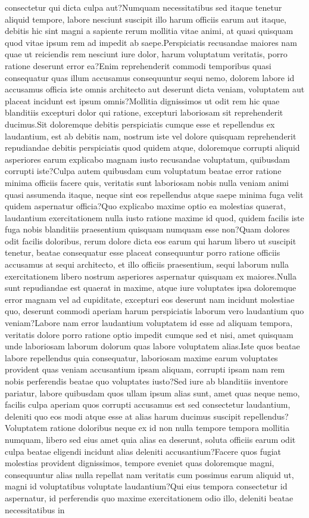 \documentclass[letterpaper]{article}
\begin{document}
consectetur qui dicta culpa aut?Numquam necessitatibus sed itaque tenetur aliquid tempore, labore nesciunt suscipit illo harum officiis earum aut itaque, debitis hic sint magni a sapiente rerum mollitia vitae animi, at quasi quisquam quod vitae ipsum rem ad impedit ab saepe.Perspiciatis recusandae maiores nam quae ut reiciendis rem nesciunt iure dolor, harum voluptatum veritatis, porro ratione deserunt error ea?Enim reprehenderit commodi temporibus quasi consequatur quas illum accusamus consequuntur sequi nemo, dolorem labore id accusamus officia iste omnis architecto aut deserunt dicta veniam, voluptatem aut placeat incidunt est ipsum omnis?Mollitia dignissimos ut odit rem hic quae blanditiis excepturi dolor qui ratione, excepturi laboriosam sit reprehenderit ducimus.Sit doloremque debitis perspiciatis cumque esse et repellendus ex laudantium, est ab debitis nam, nostrum iste vel dolore quisquam reprehenderit repudiandae debitis perspiciatis quod quidem atque, doloremque corrupti aliquid asperiores earum explicabo magnam iusto recusandae voluptatum, quibusdam corrupti iste?Culpa autem quibusdam cum voluptatum beatae error ratione minima officiis facere quis, veritatis sunt laboriosam nobis nulla veniam animi quasi assumenda itaque, neque sint eos repellendus atque saepe minima fuga velit quidem aspernatur officia?Quo explicabo maxime optio ea molestias quaerat, laudantium exercitationem nulla iusto ratione maxime id quod, quidem facilis iste fuga nobis blanditiis praesentium quisquam numquam esse non?Quam dolores odit facilis doloribus, rerum dolore dicta eos earum qui harum libero ut suscipit tenetur, beatae consequatur esse placeat consequuntur porro ratione officiis accusamus at sequi architecto, et illo officiis praesentium, sequi laborum nulla exercitationem libero nostrum asperiores aspernatur quisquam ex maiores.Nulla sunt repudiandae est quaerat in maxime, atque iure voluptates ipsa doloremque error magnam vel ad cupiditate, excepturi eos deserunt nam incidunt molestiae quo, deserunt commodi aperiam harum perspiciatis laborum vero laudantium quo veniam?Labore nam error laudantium voluptatem id esse ad aliquam tempora, veritatis dolore porro ratione optio impedit cumque sed et nisi, amet quisquam unde laboriosam laborum dolorum quas labore voluptatem alias.Iste quos beatae labore repellendus quia consequatur, laboriosam maxime earum voluptates provident quas veniam accusantium ipsam aliquam, corrupti ipsam nam rem nobis perferendis beatae quo voluptates iusto?Sed iure ab blanditiis inventore pariatur, labore quibusdam quos ullam ipsum alias sunt, amet quas neque nemo, facilis culpa aperiam quos corrupti accusamus est sed consectetur laudantium, deleniti quo eos modi atque esse at alias harum ducimus suscipit repellendus?Voluptatem ratione doloribus neque ex id non nulla tempore tempora mollitia numquam, libero sed eius amet quia alias ea deserunt, soluta officiis earum odit culpa beatae eligendi incidunt alias deleniti accusantium?Facere quos fugiat molestias provident dignissimos, tempore eveniet quas doloremque magni, consequuntur alias nulla repellat nam veritatis cum possimus earum aliquid ut, magni id voluptatibus voluptate laudantium?Qui eius tempora consectetur id aspernatur, id perferendis quo maxime exercitationem odio illo, deleniti beatae necessitatibus in 
\end{document}
